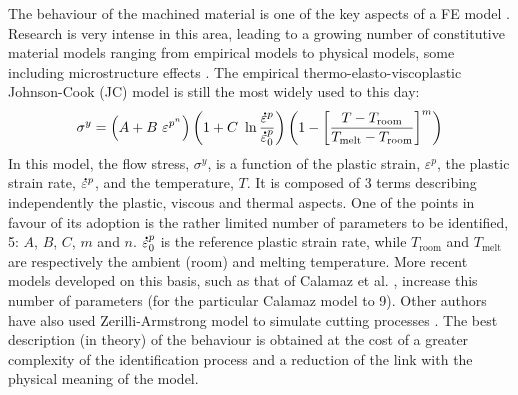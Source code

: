 \documentclass[preprint,12pt,times]{elsarticle}
\newcommand{\mdot}[1]{\accentset{\mbox{\bfseries .}}{#1}} %
\begin{document}
The behaviour of the machined material is one of the key aspects of a FE model \cite{arrazola_Recent_2013, melkote_Advances_2017}. Research is very intense in this area, leading to a growing number of constitutive material models ranging from empirical models to physical models, some including microstructure effects \cite{melkote_Advances_2017}. The empirical thermo-elasto-viscoplastic Johnson-Cook (JC) model \cite{johnson_Constitutive_1983} is still the most widely used to this day:
%
\begin{equation}\label{eq:J-C}
	\sigma^y = \left(A + B\ \varepsilon^{p^n} \right) \left(1 + C\ \ln\frac{\mdot{\varepsilon}^p}{\mdot{\varepsilon}_0^p}\right) \left(1 - \left[\frac{T - T_{\text{room}}}{T_{\text{melt}} - T_{\text{room}}}\right]^{m}\right)
\end{equation}
%
In this model, the flow stress, $\sigma^y$, is a function of the plastic strain, $\varepsilon^p$, the plastic strain rate, $\mdot{\varepsilon}^p$, and the temperature, $T$. It is composed of 3 terms describing independently the plastic, viscous and thermal aspects. One of the points in favour of its adoption is the rather limited number of parameters to be identified, 5: $A$, $B$, $C$, $m$ and $n$. $\mdot{\varepsilon}_0^p$ is the reference plastic strain rate, while $T_{\text{room}}$ and $T_{\text{melt}}$ are respectively the ambient (room) and melting temperature. More recent models developed on this basis, such as that of Calamaz et al. \cite{calamaz_New_2008}, increase this number of parameters (for the particular Calamaz model to 9). Other authors have also used Zerilli-Armstrong model to simulate cutting processes \cite{Muralli-2017-Performance}. The best description (in theory) of the behaviour is obtained at the cost of a greater complexity of the identification process and a reduction of the link with the physical meaning of the model.
\end{document}
